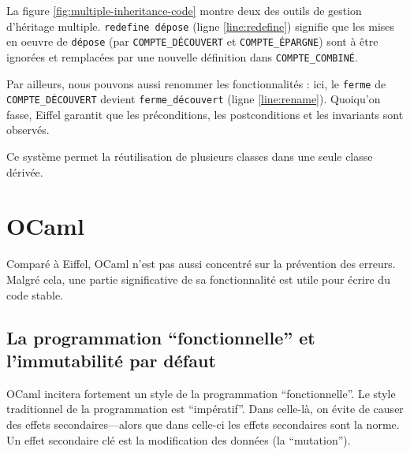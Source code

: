 \documentclass[french]{report}
\begin{document}
La figure \ref{fig:multiple-inheritance-code} montre deux des outils de gestion d'héritage multiple. \texttt{redefine dépose} (ligne \ref{line:redefine}) signifie que les mises en oeuvre de \texttt{dépose} (par \texttt{COMPTE\_DÉCOUVERT} et \texttt{COMPTE\_ÉPARGNE}) sont à être ignorées et remplacées par une nouvelle définition dans \texttt{COMPTE\_COMBINÉ}.

Par ailleurs, nous pouvons aussi renommer les fonctionnalités : ici, le \texttt{ferme} de \texttt{COMPTE\_DÉCOUVERT} devient \texttt{ferme\_découvert} (ligne \ref{line:rename}). Quoiqu'on fasse, Eiffel garantit que les préconditions, les postconditions et les invariants sont observés.

Ce système permet la réutilisation de plusieurs classes dans une seule classe dérivée.

\chapter{OCaml}

Comparé à Eiffel, OCaml n'est pas aussi concentré sur la prévention des erreurs. Malgré cela, une partie significative de sa fonctionnalité est utile pour écrire du code stable.

\section{La programmation \enquote{fonctionnelle} et l'immutabilité par défaut}

OCaml incitera fortement un style de la programmation \enquote{fonctionnelle}. Le style traditionnel de la programmation est \enquote{impératif}. Dans celle-là, on évite de causer des effets secondaires---alors que dans celle-ci les effets secondaires sont la norme. Un effet secondaire clé est la modification des données (la \enquote{mutation}).
\end{document}
